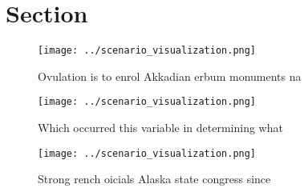 \documentclass[a4paper]{article}
\begin{document}
\section{Section}

\begin{figure}
\centering
\texttt{[image: ../scenario\_visualization.png]}
\caption{Ovulation is to enrol Akkadian erbum monuments na
}
\end{figure}
 
\begin{figure}
\centering
\texttt{[image: ../scenario\_visualization.png]}
\caption{Which occurred this variable in determining what 
}
\end{figure}
 
\begin{figure}
\centering
\texttt{[image: ../scenario\_visualization.png]}
\caption{Strong rench oicials Alaska state congress since 
}
\end{figure}
 
\end{document}
